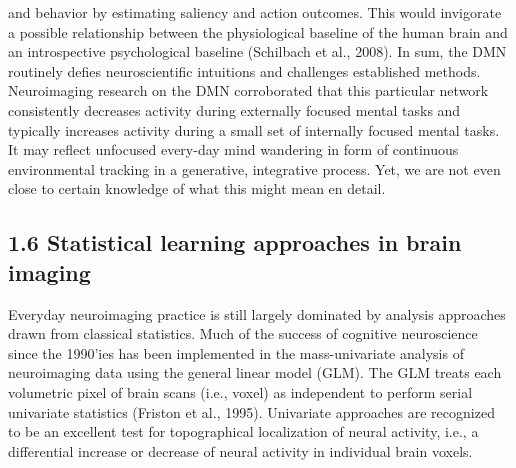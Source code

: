 \documentclass[authoryear,review,3p]{elsarticle}
\begin{document}
and behavior by estimating saliency and action outcomes.
This would invigorate a possible relationship between
the physiological baseline of the human brain
and an introspective psychological baseline
(Schilbach et al., 2008).
%
In sum, the DMN routinely defies neuroscientific intuitions
and challenges established methods.
Neuroimaging research on the DMN corroborated that this particular network
consistently decreases activity during externally focused mental tasks
and typically increases activity during a small
set of internally focused mental tasks.
It may reflect unfocused every-day mind wandering
in form of
continuous environmental tracking in a generative, integrative process.
Yet, we are not even close to certain knowledge of
what this might mean en detail.


\subsection*{1.6 Statistical learning approaches in brain imaging}

Everyday neuroimaging practice is still largely dominated by
analysis approaches drawn from classical statistics.
%
Much of the success of cognitive neuroscience
since the 1990'ies has been implemented in the
mass-univariate analysis of neuroimaging data
using the general linear model (GLM).
The GLM treats each volumetric pixel of brain scans (i.e., voxel)
as independent to perform
serial univariate statistics (Friston et al., 1995). 
%
Univariate approaches are recognized to be an excellent
test for topographical localization of neural activity,
i.e., a differential increase or decrease
of neural activity in individual brain voxels.
\end{document}
